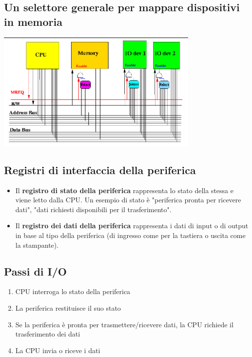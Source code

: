 \documentclass[12pt, a4paper, openany]{book}
\begin{document}
\subsection*{Un selettore generale per mappare dispositivi in memoria}
\begin{center}
    \includegraphics[width=100mm, scale=0.5]{selettore per mappare periferiche.png}
\end{center}
\subsection*{Registri di interfaccia della periferica}
\begin{itemize}
    \item Il \textbf{registro di stato della periferica} rappresenta lo stato della stessa e viene letto dalla CPU. Un esempio di stato è 
    "periferica pronta per ricevere dati", "dati richiesti disponibili per il trasferimento".
    \item Il \textbf{registro dei dati della periferica} rappresenta i dati di input o di output in base al tipo della periferica 
    (di ingresso come per la tastiera o uscita come la stampante). 
\end{itemize}

\subsection{Passi di I/O}
\begin{enumerate}
    \item CPU interroga lo stato della periferica
    \item La periferica restituisce il suo stato
    \item Se la periferica è pronta per trasmettere/ricevere dati, la CPU richiede il trasferimento dei dati
    \item La CPU invia o riceve i dati
\end{enumerate}
\end{document}
